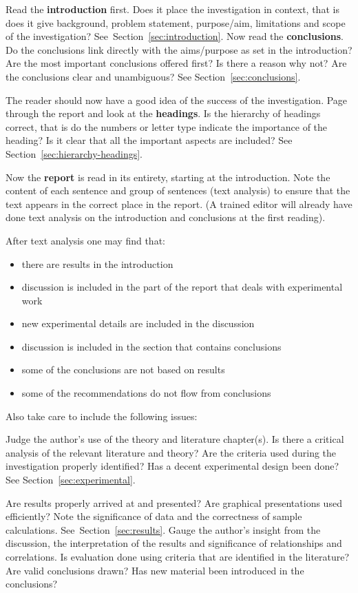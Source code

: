\documentclass[a5paper, 10pt]{article}
\newcommand{\strongemph}[1]{\textbf{#1}}
\begin{document}
Read the \strongemph{introduction} first.  Does it place the
investigation in context, that is does it give background, problem
statement, purpose/aim, limitations and scope of the investigation?
See~Section~\ref{sec:introduction}.  Now read the
\strongemph{conclusions}.  Do the conclusions link directly with the
aims/purpose as set in the introduction?  Are the most important
conclusions offered first?  Is there a reason why not?  Are the
conclusions clear and unambiguous?  See
Section~\ref{sec:conclusions}.

The reader should now have a good idea of the success of the
investigation.  Page through the report and look at the
\strongemph{headings}.  Is the hierarchy of headings correct, that is do
the numbers or letter type indicate the importance of the heading?  Is
it clear that all the important aspects are included?  See
Section~\ref{sec:hierarchy-headings}.

Now the \strongemph{report} is read in its entirety, starting at the
introduction.  Note the content of each sentence and group of
sentences (text analysis) to ensure that the text appears in the
correct place in the report.  (A trained editor will already have done
text analysis on the introduction and conclusions at the first
reading).

After text analysis one may find that:
\begin{itemize}
\item there are results in the introduction
\item discussion is included in the part of the report that deals with
  experimental work
\item new experimental details are included in the discussion
\item discussion is included in the section that contains conclusions
\item some of the conclusions are not based on results
\item some of the recommendations do not flow from conclusions
\end{itemize}

Also take care to include the following issues:

Judge the author's use of the theory and literature chapter(s).  Is
there a critical analysis of the relevant literature and theory?  Are
the criteria used during the investigation properly identified?  Has a
decent experimental design been done?  See
Section~\ref{sec:experimental}.

Are results properly arrived at and presented?  Are graphical
presentations used efficiently?  Note the significance of data and the
correctness of sample calculations.  See~Section~\ref{sec:results}.
Gauge the author's insight from the discussion, the interpretation of
the results and significance of relationships and correlations.  Is
evaluation done using criteria that are identified in the literature?
Are valid conclusions drawn?  Has new material been introduced in the
conclusions?
\end{document}
